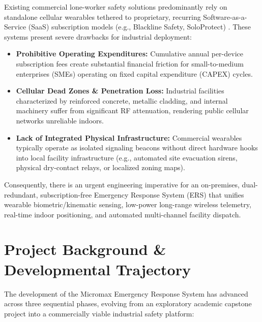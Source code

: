 Existing commercial lone-worker safety solutions predominantly rely on standalone cellular wearables tethered to proprietary, recurring Software-as-a-Service (SaaS) subscription models (e.g., Blackline Safety, SoloProtect) \cite{lone_worker_safety_review}. These systems present severe drawbacks for industrial deployment:
\begin{itemize}
    \item \textbf{Prohibitive Operating Expenditures:} Cumulative annual per-device subscription fees create substantial financial friction for small-to-medium enterprises (SMEs) operating on fixed capital expenditure (CAPEX) cycles.
    \item \textbf{Cellular Dead Zones \& Penetration Loss:} Industrial facilities characterized by reinforced concrete, metallic cladding, and internal machinery suffer from significant RF attenuation, rendering public cellular networks unreliable indoors.
    \item \textbf{Lack of Integrated Physical Infrastructure:} Commercial wearables typically operate as isolated signaling beacons without direct hardware hooks into local facility infrastructure (e.g., automated site evacuation sirens, physical dry-contact relays, or localized zoning maps).
\end{itemize}

Consequently, there is an urgent engineering imperative for an on-premises, dual-redundant, subscription-free Emergency Response System (ERS) that unifies wearable biometric/kinematic sensing, low-power long-range wireless telemetry, real-time indoor positioning, and automated multi-channel facility dispatch.

\section{Project Background \& Developmental Trajectory}
The development of the Micromax Emergency Response System has advanced across three sequential phases, evolving from an exploratory academic capstone project into a commercially viable industrial safety platform:


